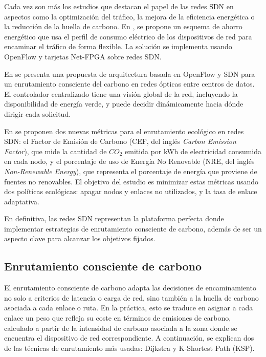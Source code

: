 Cada vez son más los estudios que destacan el papel de las redes SDN en aspectos como la optimización del tráfico, la mejora de la eficiencia energética o la reducción de la huella de carbono. En \cite{tran2015powerprofile}, se propone un esquema de ahorro energético que usa el perfil de consumo eléctrico de los dispositivos de red para encaminar el tráfico de forma flexible. La solución se implementa usando OpenFlow y tarjetas Net-FPGA sobre redes SDN.

En \cite{singh2015didcnetwork} se presenta una propuesta de arquitectura basada en OpenFlow y SDN para un enrutamiento consciente del carbono en redes ópticas entre centros de datos. El controlador centralizado tiene una visión global de la red, incluyendo la disponibilidad de energía verde, y puede decidir dinámicamente hacia dónde dirigir cada solicitud.

En \cite{hossain2020footprint} se proponen dos nuevas métricas para el enrutamiento ecológico en redes SDN: el Factor de Emisión de Carbono (CEF, del inglés \textit{Carbon Emission Factor}), que mide la cantidad de $CO_2$ emitida por kWh de electricidad consumida en cada nodo, y el porcentaje de uso de Energía No Renovable (NRE, del inglés \textit{Non-Renewable Energy}), que representa el porcentaje de energía que proviene de fuentes no renovables. El objetivo del estudio es minimizar estas métricas usando dos políticas ecológicas: apagar nodos y enlaces no utilizados, y la tasa de enlace adaptativa.

En definitiva, las redes SDN representan la plataforma perfecta donde implementar estrategias de enrutamiento consciente de carbono, además de ser un aspecto clave para alcanzar los objetivos fijados.

\subsection{Enrutamiento consciente de carbono}

El enrutamiento consciente de carbono adapta las decisiones de encaminamiento no solo a criterios de latencia o carga de red, sino también a la huella de carbono asociada a cada enlace o ruta. En la práctica, esto se traduce en asignar a cada enlace un peso que refleja su coste en términos de emisiones de carbono, calculado a partir de la intensidad de carbono asociada a la zona donde se encuentra el dispositivo de red correspondiente. A continuación, se explican dos de las técnicas de enrutamiento más usadas: Dijkstra y K-Shortest Path (KSP).

